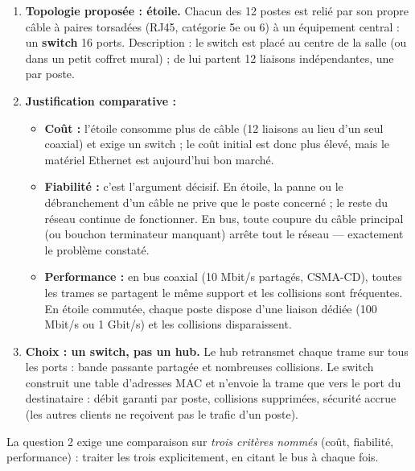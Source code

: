 \documentclass[11pt]{article}
\begin{document}
\begin{corrige}

\begin{enumerate}
    \item \textbf{Topologie proposée : étoile.} Chacun des 12 postes est relié par son propre câble à paires torsadées (RJ45, catégorie 5e ou 6) à un équipement central : un \textbf{switch} 16 ports. Description : le switch est placé au centre de la salle (ou dans un petit coffret mural) ; de lui partent 12 liaisons indépendantes, une par poste.
    \item \textbf{Justification comparative :}
    \begin{itemize}
        \item \textbf{Coût :} l'étoile consomme plus de câble (12 liaisons au lieu d'un seul coaxial) et exige un switch ; le coût initial est donc plus élevé, mais le matériel Ethernet est aujourd'hui bon marché.
        \item \textbf{Fiabilité :} c'est l'argument décisif. En étoile, la panne ou le débranchement d'un câble ne prive que le poste concerné ; le reste du réseau continue de fonctionner. En bus, toute coupure du câble principal (ou bouchon terminateur manquant) arrête tout le réseau --- exactement le problème constaté.
        \item \textbf{Performance :} en bus coaxial (10 Mbit/s partagés, CSMA-CD), toutes les trames se partagent le même support et les collisions sont fréquentes. En étoile commutée, chaque poste dispose d'une liaison dédiée (100 Mbit/s ou 1 Gbit/s) et les collisions disparaissent.
    \end{itemize}
    \item \textbf{Choix : un switch, pas un hub.} Le hub retransmet chaque trame sur tous les ports : bande passante partagée et nombreuses collisions. Le switch construit une table d'adresses MAC et n'envoie la trame que vers le port du destinataire : débit garanti par poste, collisions supprimées, sécurité accrue (les autres clients ne reçoivent pas le trafic d'un poste).
\end{enumerate}

\begin{attention}
La question 2 exige une comparaison sur \emph{trois critères nommés} (coût, fiabilité, performance) : traiter les trois explicitement, en citant le bus à chaque fois.
\end{attention}
\end{corrige}
\end{document}
